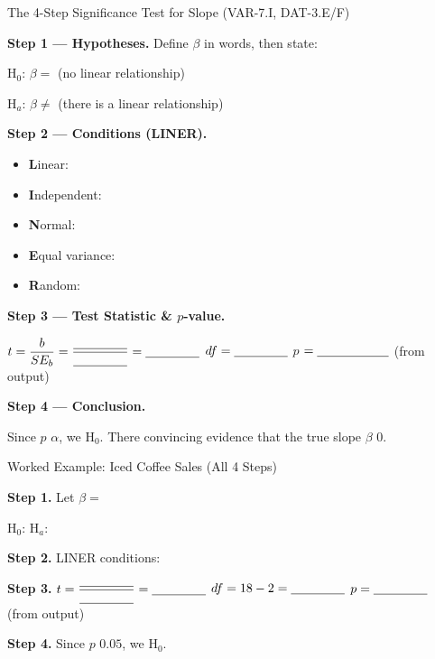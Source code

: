 \documentclass[10pt]{article}
\begin{document}
\begin{notesbox}{The 4-Step Significance Test for Slope (VAR-7.I, DAT-3.E/F)}

\textbf{Step 1 — Hypotheses.} Define $\beta$ in words, then state:

\quad H$_0$: $\beta = $ \blank{1.5cm} \quad (no linear relationship)

\quad H$_a$: $\beta \ne $ \blank{1.5cm} \quad (there is a linear relationship)

\vspace{0.12in}
\textbf{Step 2 — Conditions (LINER).}
\begin{itemize}
    \item \textbf{L}inear: \blank{8cm}
    \item \textbf{I}ndependent: \blank{8cm}
    \item \textbf{N}ormal: \blank{8cm}
    \item \textbf{E}qual variance: \blank{8cm}
    \item \textbf{R}andom: \blank{8cm}
\end{itemize}

\vspace{0.12in}
\textbf{Step 3 — Test Statistic \& $p$-value.}

\quad $t = \dfrac{b}{SE_b} = \dfrac{\blank{1.5cm}}{\blank{1.5cm}} = \blank{1.5cm}$
\qquad $df = \blank{1.5cm}$ \qquad $p$ $= \blank{2cm}$ (from output)

\vspace{0.12in}
\textbf{Step 4 — Conclusion.}

Since $p$ \blank{1cm} $\alpha$, we \blank{2.5cm} H$_0$.
There \blank{1.5cm} convincing evidence that the true slope $\beta$ \blank{1cm} $0$.

\end{notesbox}

\begin{notesbox}{Worked Example: Iced Coffee Sales (All 4 Steps)}

\textbf{Step 1.} Let $\beta = $ \writeline

\quad H$_0$: \blank{7cm} \quad H$_a$: \blank{7cm}

\vspace{0.1in}
\textbf{Step 2.} LINER conditions: 

\vspace{0.05in}
\textbf{Step 3.} $t = \dfrac{\blank{1.5cm}}{\blank{1.5cm}} = \blank{1.5cm}$
\quad $df = 18 - 2 = \blank{1.5cm}$ \quad $p = \blank{1.5cm}$ (from output)

\vspace{0.1in}
\textbf{Step 4.} Since $p$ \blank{1cm} $0.05$, we \blank{2.5cm} H$_0$.


\end{notesbox}
\end{document}

